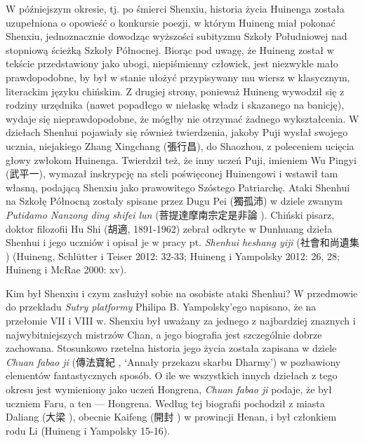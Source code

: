 W późniejszym okresie, tj. po śmierci Shenxiu, historia życia Huinenga została uzupełniona o opowieść o konkursie poezji, w którym Huineng miał pokonać Shenxiu, jednoznacznie dowodząc wyższości subityzmu Szkoły Południowej nad stopniową ścieżką Szkoły Północnej. Biorąc pod uwagę, że Huineng został w tekście przedstawiony jako ubogi, niepiśmienny człowiek, jest niezwykle mało prawdopodobne, by był w stanie ułożyć przypisywany mu wiersz w klasycznym, literackim języku chińskim. Z drugiej strony, ponieważ Huineng wywodził się z rodziny urzędnika (nawet popadłego w niełaskę władz i skazanego na banicję), wydaje się nieprawdopodobne, że mógłby nie otrzymać żadnego wykształcenia. W dziełach Shenhui pojawiały się również twierdzenia, jakoby Puji wysłał swojego ucznia, niejakiego Zhang Xingchang (張行昌), do Shaozhou, z poleceniem ucięcia głowy zwłokom Huinenga. Twierdził też, że inny uczeń Puji, imieniem Wu Pingyi (武平一), wymazał inskrypcję na steli poświęconej Huinengowi i wstawił tam własną, podającą Shenxiu jako prawowitego Szóstego Patriarchę. Ataki Shenhui na Szkołę Północną zostały spisane przez Dugu Pei (獨孤沛) w dziele zwanym \textit{Putidamo Nanzong ding shifei lun} (菩提達摩南宗定是非論 ). Chiński pisarz, doktor filozofii Hu Shi (胡適, 1891-1962) zebrał odkryte w Dunhuang dzieła Shenhui i jego uczniów i opisał je w pracy pt. \textit{Shenhui heshang yiji} (社會和尚遺集 ) %
(Huineng, Schlütter i Teiser 2012: 32-33; Huineng i Yampolsky 2012: 26, 28; Huineng i McRae 2000: xv).

Kim był Shenxiu i czym zasłużył sobie na osobiste ataki Shenhui? W przedmowie do przekładu \textit{Sutry platformy} Philipa B. Yampolsky'ego napisano, że na przełomie VII i VIII w. Shenxiu był uważany za jednego z najbardziej znaznych i najwybitniejszych mistrzów Chan, a jego biografia jest szczególnie dobrze zachowana. Stosunkowo rzetelna historia jego życia została zapisana w dziele \textit{Chuan fabao ji} (傳法寶紀 , `Annały przekazu skarbu Dharmy') w pozbawiony elementów fantastycznych sposób. O ile we wszystkich innych dziełach z tego okresu jest wymieniony jako uczeń Hongrena, \textit{Chuan fabao ji} podaje, że był uczniem Faru, a ten --- Hongrena. Według tej biografii pochodził z miasta Daliang (大梁 ), obecnie Kaifeng (開封 ) w prowincji Henan, i był członkiem rodu Li (Huineng i Yampolsky 15-16). %


